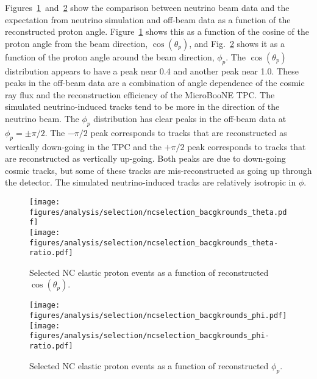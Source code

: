     Figures~\ref{fig:ncetheta}~and~\ref{fig:ncephi} show the comparison between
    neutrino beam data and the expectation from neutrino simulation and
    off-beam data as a function of the reconstructed proton angle.
    Figure~\ref{fig:ncetheta} shows this as a function of the cosine of the
    proton angle from the beam direction, $\cos(\theta_p)$, and
    Fig.~\ref{fig:ncephi} shows it as a function of the proton angle around the
    beam direction, $\phi_p$. The $\cos(\theta_p)$ distribution appears to have
    a peak near 0.4 and another peak near 1.0. These peaks in the off-beam data
    are a combination of angle dependence of the cosmic ray flux and the
    reconstruction efficiency of the MicroBooNE TPC. The simulated
    neutrino-induced tracks tend to be more in the direction of the neutrino
    beam. The $\phi_p$ distribution has clear peaks in the off-beam data at
    $\phi_p = \pm \pi/2$. The $-\pi/2$ peak corresponds to tracks that are
    reconstructed as vertically down-going in the TPC and the $+\pi/2$ peak
    corresponds to tracks that are reconstructed as vertically up-going. Both
    peaks are due to down-going cosmic tracks, but some of these tracks are
    mis-reconstructed as going up through the detector. The simulated
    neutrino-induced tracks are relatively isotropic in $\phi$.
    \begin{figure}[ht]
      \centering
      \texttt{[image: figures/analysis/selection/ncselection\_bacgkrounds\_theta.pdf]} \\
      \texttt{[image: figures/analysis/selection/ncselection\_bacgkrounds\_theta-ratio.pdf]} \\
      \caption{Selected NC elastic proton events as a function of reconstructed $\cos(\theta_p)$.}
      \label{fig:ncetheta}
    \end{figure}
    \begin{figure}[ht]
      \centering
      \texttt{[image: figures/analysis/selection/ncselection\_bacgkrounds\_phi.pdf]} \\
      \texttt{[image: figures/analysis/selection/ncselection\_bacgkrounds\_phi-ratio.pdf]} \\
      \caption{Selected NC elastic proton events as a function of reconstructed $\phi_p$.}
      \label{fig:ncephi}
    \end{figure}

